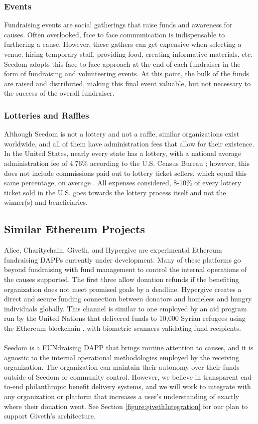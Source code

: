 \documentclass[11pt]{article}
\begin{document}
\subsubsection{Events}

Fundraising events are social gatherings that raise funds and awareness for causes. Often overlooked, face to face communication is indispensable to furthering a cause. However, these gathers can get expensive when selecting a venue, hiring temporary staff, providing food, creating informative materials, etc. Seedom adopts this face-to-face approach at the end of each fundraiser in the form of fundraising and volunteering events. At this point, the bulk of the funds are raised and distributed, making this final event valuable, but not necessary to the success of the overall fundraiser.

\subsubsection{Lotteries and Raffles}

Although Seedom is not a lottery and not a raffle, similar organizations exist worldwide, and all of them have administration fees that allow for their existence. In the United States, nearly every state has a lottery, with a national average administration fee of 4.76\% according to the U.S. Census Bureau \cite{3}; however, this does not include commissions paid out to lottery ticket sellers, which equal this same percentage, on average \cite{4}. All expenses considered, 8-10\% of every lottery ticket sold in the U.S. goes towards the lottery process itself and not the winner(s) and beneficiaries.

\subsection{Similar Ethereum Projects}

Alice, Charitychain, Giveth, and Hypergive are experimental Ethereum fundraising DAPPs currently under development. Many of these platforms go beyond fundraising with fund management to control the internal operations of the causes supported. The first three allow donation refunds if the benefiting organization does not meet promised goals by a deadline. Hypergive creates a direct and secure funding connection between donators and homeless and hungry individuals globally. This channel is similar to one employed by an aid program run by the United Nations that delivered funds to 10,000 Syrian refugees using the Ethereum blockchain \cite{6}, with biometric scanners validating fund recipients.\\\\
Seedom is a FUNdraising DAPP that brings routine attention to causes, and it is agnostic to the internal operational methodologies employed by the receiving organization. The organization can maintain their autonomy over their funds outside of Seedom or community control. However, we believe in transparent end-to-end philanthropic benefit delivery systems, and we will work to integrate with any organization or platform that increases a user's understanding of exactly where their donation went. See Section \ref{figure:givethIntegration} for our plan to support Giveth's architecture.
\end{document}
